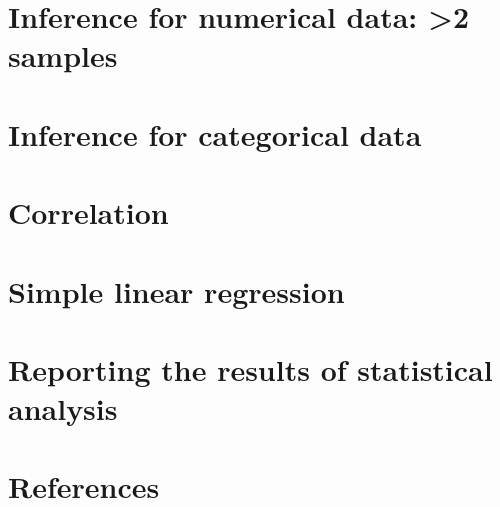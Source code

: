 \documentclass[
  16pt,
  letterpaper,
]{scrbook}
\newlength{\cslhangindent}
\newlength{\cslentryspacingunit} %
\newenvironment{CSLReferences}[2] %
 {%
  \setlength{\parindent}{0pt}
  \ifodd #1
  \let\oldpar\par
  \def\par{\hangindent=\cslhangindent\oldpar}
  \fi
  \setlength{\parskip}{#2\cslentryspacingunit}
 }%
 {}
\begin{document}
\hypertarget{inference-for-numerical-data-2-samples-1}{%
\chapter{Inference for numerical data: \textgreater2
samples}\label{inference-for-numerical-data-2-samples-1}}


\hypertarget{inference-for-categorical-data}{%
\chapter{Inference for categorical
data}\label{inference-for-categorical-data}}


\hypertarget{correlation}{%
\chapter{Correlation}\label{correlation}}


\hypertarget{simple-linear-regression}{%
\chapter{Simple linear regression}\label{simple-linear-regression}}


\hypertarget{reporting-the-results-of-statistical-analysis}{%
\chapter{Reporting the results of statistical
analysis}\label{reporting-the-results-of-statistical-analysis}}


\hypertarget{references}{%
\chapter*{References}\label{references}}

\hypertarget{refs}{}
\begin{CSLReferences}{0}{0}
\end{CSLReferences}


\backmatter
\end{document}
